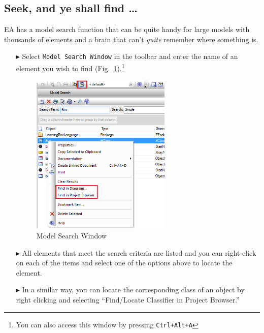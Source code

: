 \newpage

\hypertarget{subsec:seekAndFind}{}

\subsection{Seek, and ye shall find \ldots}

EA has a model search function that can be quite handy for large models with thousands of elements and a brain that can't \emph{quite} remember where something
is.

\begin{enumerate}

\item[$\blacktriangleright$]Select \texttt{Model Search Window} in the toolbar and enter the name of an element you wish to find
(Fig.~\ref{fig_search01}).\footnote{You can also access this window by pressing
\texttt{Ctrl+Alt+A}}

\vspace{0.5cm}

\begin{figure}[htbp]
\begin{center}
  \includegraphics[width=0.63\textwidth]{search1}
  \caption{Model Search Window}  
  \label{fig_search01}
\end{center}
\end{figure}

\item[$\blacktriangleright$] All elements that meet the search criteria are listed and you can right-click on each of the items and select one of the options
above to locate the element.

\item[$\blacktriangleright$] In a similar way, you can locate the corresponding class of an object by right clicking and selecting ``Find/Locate Classifier in
Project Browser.''

\vfill

\end{enumerate}
